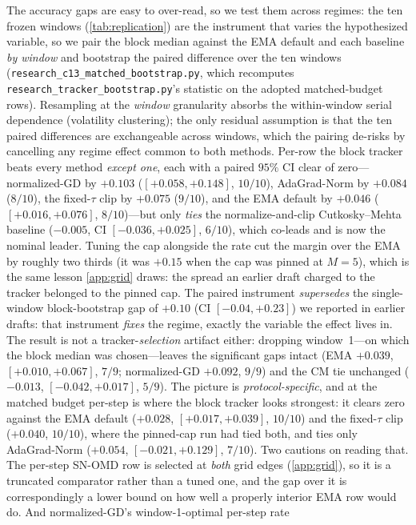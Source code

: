 \documentclass{article}
\begin{document}
The accuracy gaps are easy to over-read, so we test them across regimes: the ten frozen
windows (\cref{tab:replication}) are the instrument that varies the hypothesized variable, so
we pair the block median against the EMA default and each baseline \emph{by window} and
bootstrap the paired difference over the ten windows
(\texttt{research\_c13\_matched\_bootstrap.py}, which recomputes
\texttt{research\_tracker\_bootstrap.py}'s statistic on the adopted matched-budget rows).
Resampling at the \emph{window} granularity
absorbs the within-window serial dependence (volatility clustering); the only residual
assumption is that the ten paired differences are exchangeable across windows, which the
pairing de-risks by cancelling any regime effect common to both methods. Per-row the block
tracker beats every method \emph{except one}, each with a paired $95\%$ CI clear of
zero---normalized-GD by $+0.103$ ($[+0.058,+0.148]$, $10/10$), AdaGrad-Norm by $+0.084$
($8/10$), the fixed-$\tau$ clip by $+0.075$ ($9/10$), and the EMA default by $+0.046$
($[+0.016,+0.076]$, $8/10$)---but only \emph{ties} the normalize-and-clip Cutkosky--Mehta
baseline ($-0.005$, CI $[-0.036,+0.025]$, $6/10$), which co-leads and is now the nominal
leader. Tuning the cap alongside the rate cut the margin over the EMA by roughly two thirds
(it was $+0.15$ when the cap was pinned at $M{=}5$), which is the same lesson \cref{app:grid}
draws: the spread an earlier draft charged to the tracker belonged to the pinned cap. The paired instrument \emph{supersedes} the single-window block-bootstrap gap of
$+0.10$ (CI $[-0.04,+0.23]$) we reported in earlier drafts: that instrument \emph{fixes} the
regime, exactly the variable the effect lives in. The result is not a tracker-\emph{selection}
artifact either: dropping window~1---on which the block median was chosen---leaves the
significant gaps intact (EMA $+0.039$, $[+0.010,+0.067]$, $7/9$; normalized-GD $+0.092$,
$9/9$) and the CM tie unchanged ($-0.013$, $[-0.042,+0.017]$, $5/9$). The picture is
\emph{protocol-specific}, and at the matched budget per-step is where the block tracker looks
strongest: it clears zero against the EMA default ($+0.028$, $[+0.017,+0.039]$, $10/10$) and
the fixed-$\tau$ clip ($+0.040$, $10/10$), where the pinned-cap run had tied both, and ties only
AdaGrad-Norm ($+0.054$, $[-0.021,+0.129]$, $7/10$). Two cautions on reading that. The per-step
SN-OMD row is selected at \emph{both} grid edges (\cref{app:grid}), so it is a truncated
comparator rather than a tuned one, and the gap over it is correspondingly a lower bound on how
well a properly interior EMA row would do. And normalized-GD's window-1-optimal per-step rate
\end{document}
